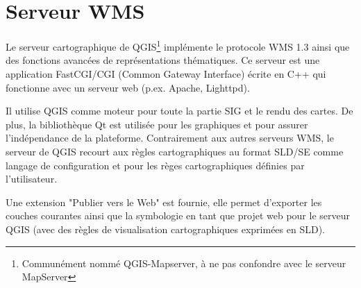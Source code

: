 

 \section{Serveur WMS}\label{sec:ogc-wmsserver}

Le serveur cartographique de QGIS\footnote{Communément nommé QGIS-Mapserver, à ne pas confondre avec le serveur MapServer} implémente le protocole WMS 1.3 ainsi que des fonctions avancées de représentations thématiques. Ce serveur est une application FastCGI/CGI (Common Gateway Interface) écrite en C++ qui fonctionne avec un serveur web (p.ex. Apache, Lighttpd).

Il utilise QGIS comme moteur pour toute la partie SIG et le rendu des cartes. De plus, la bibliothèque Qt est utilisée pour les graphiques et pour assurer l'indépendance de la plateforme. Contrairement aux autres serveurs WMS, le serveur de QGIS recourt aux règles cartographiques au format SLD/SE comme langage de configuration et pour les règes cartographiques définies par l'utilisateur.

Une extension "Publier vers le Web" est fournie, elle permet d'exporter les couches courantes ainsi que la symbologie en tant que projet web pour le serveur QGIS (avec des règles de visualisation cartographiques exprimées en SLD).

